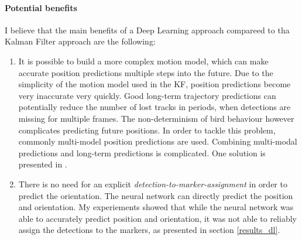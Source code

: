 \documentclass{article}
\begin{document}
\paragraph{Potential benefits}
I believe that the main benefits of a Deep Learning approach  compareed to tha Kalman Filter approach are the following: 
\begin{enumerate}
	\item It is possible to build a more complex motion model, which can make accurate position predictions multiple steps into the future. Due to the simplicity of the motion model used in the KF, position predictions become very inaccurate very quickly. Good long-term trajectory predictions can potentially reduce the number of lost tracks in periods, when detections are missing for multiple frames. The non-determinism of bird behaviour however complicates predicting future positions. In order to tackle this problem, commonly multi-model position predictions are used. Combining multi-modal predictions and long-term predictions is complicated. One solution is presented in %
	.
	\item There is no need for an explicit \emph{detection-to-marker-assignment} in order to predict the orientation. The neural network can directly predict the position and orientation. My experiements showed that while the neural network was able to accurately predict position and orientation, it was not able to reliably assign the detections to the markers, as presented in section \ref{results_dl}. 
\end{enumerate} 

\end{document}

